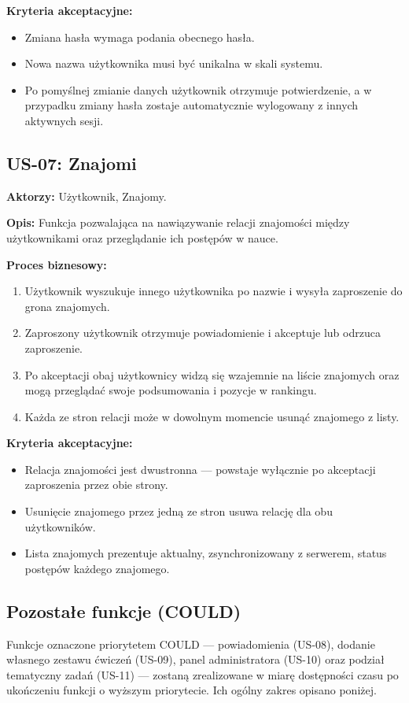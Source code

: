 \documentclass[polish]{aghengthesis}
\begin{document}
\textbf{Kryteria akceptacyjne:}
\begin{itemize}
    \item Zmiana hasła wymaga podania obecnego hasła.
    \item Nowa nazwa użytkownika musi być unikalna w skali systemu.
    \item Po pomyślnej zmianie danych użytkownik otrzymuje potwierdzenie,
    a w przypadku zmiany hasła zostaje automatycznie wylogowany z innych
    aktywnych sesji.
\end{itemize}

\subsection{US-07: Znajomi}
\textbf{Aktorzy:} Użytkownik, Znajomy.

\textbf{Opis:} Funkcja pozwalająca na nawiązywanie relacji znajomości między
użytkownikami oraz przeglądanie ich postępów w nauce.

\textbf{Proces biznesowy:}
\begin{enumerate}
    \item Użytkownik wyszukuje innego użytkownika po nazwie i wysyła
    zaproszenie do grona znajomych.
    \item Zaproszony użytkownik otrzymuje powiadomienie i akceptuje lub
    odrzuca zaproszenie.
    \item Po akceptacji obaj użytkownicy widzą się wzajemnie na liście
    znajomych oraz mogą przeglądać swoje podsumowania i pozycje w rankingu.
    \item Każda ze stron relacji może w dowolnym momencie usunąć znajomego
    z listy.
\end{enumerate}

\textbf{Kryteria akceptacyjne:}
\begin{itemize}
    \item Relacja znajomości jest dwustronna — powstaje wyłącznie po
    akceptacji zaproszenia przez obie strony.
    \item Usunięcie znajomego przez jedną ze stron usuwa relację dla obu
    użytkowników.
    \item Lista znajomych prezentuje aktualny, zsynchronizowany z serwerem,
    status postępów każdego znajomego.
\end{itemize}

\subsection{Pozostałe funkcje (COULD)}
Funkcje oznaczone priorytetem COULD — powiadomienia (US-08), dodanie
własnego zestawu ćwiczeń (US-09), panel administratora (US-10) oraz podział
tematyczny zadań (US-11) — zostaną zrealizowane w miarę dostępności czasu
po ukończeniu funkcji o wyższym priorytecie. Ich ogólny zakres opisano
poniżej.
\end{document}
